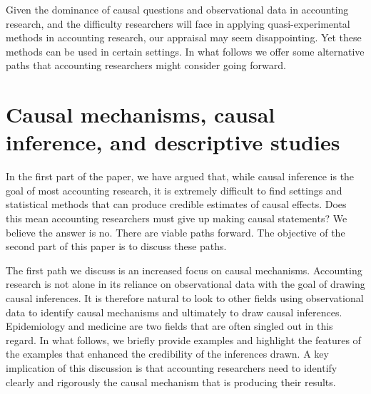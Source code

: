 \documentclass[12pt,reqno,titlepage]{amsart}
\theoremstyle{definition}
\begin{document}
\begin{doublespace}
Given the dominance of causal questions and observational data in accounting research, and the difficulty researchers will face in applying quasi-experimental methods in accounting research, our appraisal may seem disappointing. Yet these methods can be used in certain settings. In what follows we offer some alternative paths that accounting researchers might consider going forward.

\section{Causal mechanisms, causal inference, and descriptive studies} \label{sec:mech}

In the first part of the paper, we have argued that, while causal inference is the goal of most accounting research, it is extremely difficult to find settings and statistical methods that can produce credible estimates of causal effects. 
Does this mean accounting researchers must give up making causal statements? 
We believe the answer is no. There are viable paths forward. 
The objective of the second part of this paper is to discuss these paths. 

The first path we discuss is an increased focus on causal mechanisms. 
Accounting research is not alone in its reliance on observational data with the goal of drawing causal inferences. 
It is therefore natural to look to other fields using observational data to identify causal mechanisms and ultimately to draw causal inferences.
Epidemiology and medicine are two fields that are often singled out in this regard.
In what follows, we briefly provide examples and highlight the features of the examples that enhanced the credibility of the inferences drawn.
A key implication of this discussion is that accounting researchers need to identify clearly and rigorously the causal mechanism that is producing their results.


\end{doublespace}
\end{document}
